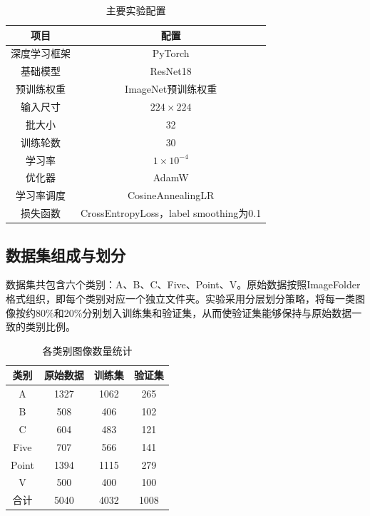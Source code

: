 \documentclass[11pt]{article}
\begin{document}
\begin{table}[H]
    \centering
    \caption{主要实验配置}
    \begin{tabular}{cc}
        \toprule
        项目 & 配置 \\
        \midrule
        深度学习框架 & PyTorch \\
        基础模型 & ResNet18 \\
        预训练权重 & ImageNet预训练权重 \\
        输入尺寸 & $224 \times 224$ \\
        批大小 & 32 \\
        训练轮数 & 30 \\
        学习率 & $1\times10^{-4}$ \\
        优化器 & AdamW \\
        学习率调度 & CosineAnnealingLR \\
        损失函数 & CrossEntropyLoss，label smoothing为0.1 \\
        \bottomrule
    \end{tabular}
\end{table}

\subsection{数据集组成与划分}
数据集共包含六个类别：A、B、C、Five、Point、V。原始数据按照ImageFolder格式组织，即每个类别对应一个独立文件夹。实验采用分层划分策略，将每一类图像按约80\%和20\%分别划入训练集和验证集，从而使验证集能够保持与原始数据一致的类别比例。

\begin{table}[H]
    \centering
    \caption{各类别图像数量统计}
    \begin{tabular}{cccc}
        \toprule
        类别 & 原始数据 & 训练集 & 验证集 \\
        \midrule
        A & 1327 & 1062 & 265 \\
        B & 508 & 406 & 102 \\
        C & 604 & 483 & 121 \\
        Five & 707 & 566 & 141 \\
        Point & 1394 & 1115 & 279 \\
        V & 500 & 400 & 100 \\
        \midrule
        合计 & 5040 & 4032 & 1008 \\
        \bottomrule
    \end{tabular}
\end{table}
\end{document}
